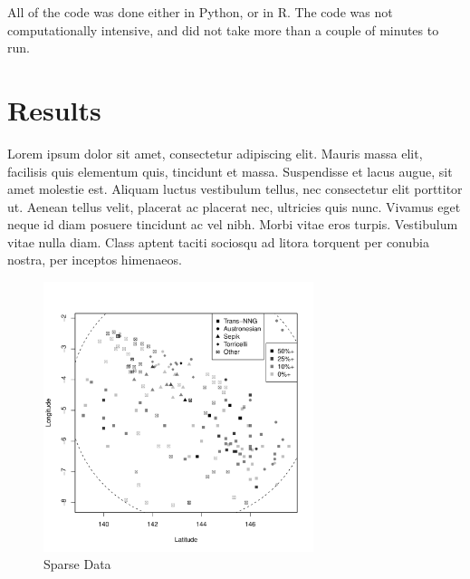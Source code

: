 \documentclass[11pt]{article}
\begin{document}

All of the code was done either in Python, or in R. %
The code was not computationally intensive, and did not take more than a couple of minutes to run.


\section{Results} %

Lorem ipsum dolor sit amet, consectetur adipiscing elit. Mauris massa elit, facilisis quis elementum quis, tincidunt et massa. Suspendisse et lacus augue, sit amet molestie est. Aliquam luctus vestibulum tellus, nec consectetur elit porttitor ut. Aenean tellus velit, placerat ac placerat nec, ultricies quis nunc. Vivamus eget neque id diam posuere tincidunt ac vel nibh. Morbi vitae eros turpis. Vestibulum vitae nulla diam. Class aptent taciti sociosqu ad litora torquent per conubia nostra, per inceptos himenaeos.


\begin{figure}[h]
\centering
\includegraphics[width=3.1in]
{graph1.pdf} 
\caption{Sparse Data} 
\label{fig:sparse} 
\end{figure}
\end{document}
